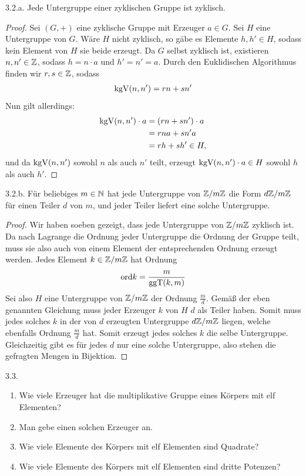 \documentclass{article}
\newcommand{\ex}[1]{\tit{Übung} #1.}
\begin{document}
		\newpar
		\ex{3.2.a} Jede Untergruppe einer zyklischen Gruppe ist zyklisch.
		\begin{proof}
			Sei $(G,+)$ eine zyklische Gruppe mit Erzeuger $a \in G$. Sei $H$ eine Untergruppe von $G$. Wäre $H$ nicht zyklisch, so gäbe es Elemente $h, h' \in H$, sodass kein Element von $H$ sie beide erzeugt.
			\newpar
			Da $G$ selbst zyklisch ist, existieren $n, n' \in \mathbb{Z}$, sodass $h = n \cdot a$ und $h' = n' = a$. Durch den Euklidischen Algorithmus finden wir $r,s \in \mathbb{Z}$, sodass
			\begin{align*}
				\textnormal{kgV}(n, n') = rn + sn'
			\end{align*}
			Nun gilt allerdings:
			\begin{align*}
				\textnormal{kgV}(n, n') \cdot a
				&= (rn + sn') \cdot a\\
				&= rna + sn'a\\
				&= rh + sh' \in H,
			\end{align*}
			und da $\textnormal{kgV}(n, n')$ sowohl $n$ als auch $n'$ teilt, erzeugt $\textnormal{kgV}(n, n') \cdot a \in H$ sowohl $h$ als auch $h'$.
		\end{proof}
		\newpar
		\ex{3.2.b} Für beliebiges $m \in \mathbb{N}$ hat jede Untergruppe von $\mathbb{Z}/m\mathbb{Z}$ die Form $d\mathbb{Z}/m\mathbb{Z}$ für einen Teiler $d$ von $m$, und jeder Teiler liefert eine solche Untergruppe.
		\begin{proof}
			Wir haben soeben gezeigt, dass jede Untergruppe von $\mathbb{Z}/m\mathbb{Z}$ zyklisch ist. Da nach Lagrange die Ordnung jeder Untergruppe die Ordnung der Gruppe teilt, muss sie also auch von einem Element der entsprechenden Ordnung erzeugt werden.
			\newpar
			Jedes Element $k \in \mathbb{Z}/m\mathbb{Z}$ hat Ordnung
			\begin{align*}
				\textnormal{ord} k = \frac{m}{\textnormal{ggT}(k,m)}
			\end{align*} 
			Sei also $H$ eine Untergruppe von $\mathbb{Z}/m\mathbb{Z}$ der Ordnung $\frac{m}{d}$. Gemäß der eben genannten Gleichung muss jeder Erzeuger $k$ von $H$ $d$ als Teiler haben. Somit muss jedes solches $k$ in der von $d$ erzeugten Untergruppe $d\mathbb{Z}/m\mathbb{Z}$ liegen, welche ebenfalls Ordnung $\frac{m}{d}$ hat. Somit erzeugt jedes solches $k$ die selbe Untergruppe. Gleichzeitig gibt es für jedes $d$ nur eine solche Untergruppe, also stehen die gefragten Mengen in Bijektion.
		\end{proof}
		\newpar
		\ex{3.3} 
		\begin{enumerate}
			\item Wie viele Erzeuger hat die multiplikative Gruppe eines Körpers mit elf Elementen?
			\item Man gebe einen solchen Erzeuger an.
			\item Wie viele Elemente des Körpers mit elf Elementen sind Quadrate?
			\item Wie viele Elemente des Körpers mit elf Elementen sind dritte Potenzen?
		\end{enumerate}
\end{document}
